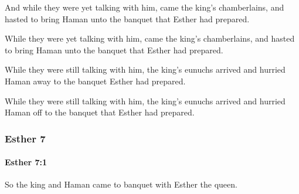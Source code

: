 			And while they were yet talking with him, came the king’s chamberlains, and hasted to bring Haman unto the banquet that Esther had prepared.

			\begin{versebox}
					\item[BHS] 
					\item[LXX] 
					\item[ASV] While they were yet talking with him, came the king's chamberlains, and hasted to bring Haman unto the banquet that Esther had prepared.
					\item[NIV] While they were still talking with him, the king’s eunuchs arrived and hurried Haman away to the banquet Esther had prepared.
					\item[NRSV] While they were still talking with him, the king’s eunuchs arrived and hurried Haman off to the banquet that Esther had prepared.
			\end{versebox}
	\subsubsection{Esther 7} %
		\label{ESTHER-7}

		\paragraph{Esther 7:1} %
			\label{ESTHER-7-1}

			So the king and Haman came to banquet with Esther the queen.


